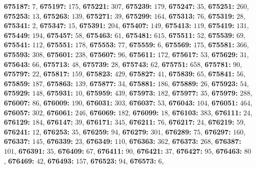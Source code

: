 \textsf{\bfseries 675187:} $7$, \textsf{\bfseries 675197:} $175$, \textsf{\bfseries 675221:} $307$, \textsf{\bfseries 675239:} $179$, \textsf{\bfseries 675247:} $35$, \textsf{\bfseries 675251:} $260$, \textsf{\bfseries 675253:} $13$, \textsf{\bfseries 675263:} $139$, \textsf{\bfseries 675271:} $39$, \textsf{\bfseries 675299:} $164$, \textsf{\bfseries 675313:} $76$, \textsf{\bfseries 675319:} $28$, \textsf{\bfseries 675341:} $2$, \textsf{\bfseries 675347:} $15$, \textsf{\bfseries 675391:} $204$, \textsf{\bfseries 675407:} $149$, \textsf{\bfseries 675413:} $119$, \textsf{\bfseries 675419:} $131$, \textsf{\bfseries 675449:} $194$, \textsf{\bfseries 675457:} $58$, \textsf{\bfseries 675463:} $61$, \textsf{\bfseries 675481:} $615$, \textsf{\bfseries 675511:} $52$, \textsf{\bfseries 675539:} $69$, \textsf{\bfseries 675541:} $112$, \textsf{\bfseries 675551:} $178$, \textsf{\bfseries 675553:} $77$, \textsf{\bfseries 675559:} $6$, \textsf{\bfseries 675569:} $175$, \textsf{\bfseries 675581:} $366$, \textsf{\bfseries 675593:} $308$, \textsf{\bfseries 675601:} $238$, \textsf{\bfseries 675607:} $96$, \textsf{\bfseries 675611:} $172$, \textsf{\bfseries 675617:} $53$, \textsf{\bfseries 675629:} $31$, \textsf{\bfseries 675643:} $66$, \textsf{\bfseries 675713:} $48$, \textsf{\bfseries 675739:} $28$, \textsf{\bfseries 675743:} $62$, \textsf{\bfseries 675751:} $658$, \textsf{\bfseries 675781:} $90$, \textsf{\bfseries 675797:} $22$, \textsf{\bfseries 675817:} $159$, \textsf{\bfseries 675823:} $429$, \textsf{\bfseries 675827:} $41$, \textsf{\bfseries 675839:} $65$, \textsf{\bfseries 675841:} $56$, \textsf{\bfseries 675859:} $187$, \textsf{\bfseries 675863:} $139$, \textsf{\bfseries 675877:} $34$, \textsf{\bfseries 675881:} $186$, \textsf{\bfseries 675889:} $26$, \textsf{\bfseries 675923:} $54$, \textsf{\bfseries 675929:} $148$, \textsf{\bfseries 675931:} $10$, \textsf{\bfseries 675959:} $439$, \textsf{\bfseries 675973:} $182$, \textsf{\bfseries 675977:} $35$, \textsf{\bfseries 675979:} $288$, \textsf{\bfseries 676007:} $86$, \textsf{\bfseries 676009:} $190$, \textsf{\bfseries 676031:} $303$, \textsf{\bfseries 676037:} $53$, \textsf{\bfseries 676043:} $104$, \textsf{\bfseries 676051:} $464$, \textsf{\bfseries 676057:} $302$, \textsf{\bfseries 676061:} $246$, \textsf{\bfseries 676069:} $182$, \textsf{\bfseries 676099:} $18$, \textsf{\bfseries 676103:} $383$, \textsf{\bfseries 676111:} $24$, \textsf{\bfseries 676129:} $184$, \textsf{\bfseries 676147:} $39$, \textsf{\bfseries 676171:} $345$, \textsf{\bfseries 676211:} $76$, \textsf{\bfseries 676217:} $24$, \textsf{\bfseries 676219:} $59$, \textsf{\bfseries 676241:} $12$, \textsf{\bfseries 676253:} $35$, \textsf{\bfseries 676259:} $94$, \textsf{\bfseries 676279:} $301$, \textsf{\bfseries 676289:} $75$, \textsf{\bfseries 676297:} $160$, \textsf{\bfseries 676337:} $145$, \textsf{\bfseries 676339:} $23$, \textsf{\bfseries 676349:} $110$, \textsf{\bfseries 676363:} $362$, \textsf{\bfseries 676373:} $268$, \textsf{\bfseries 676387:} $101$, \textsf{\bfseries 676391:} $35$, \textsf{\bfseries 676409:} $67$, \textsf{\bfseries 676411:} $90$, \textsf{\bfseries 676421:} $37$, \textsf{\bfseries 676427:} $95$, \textsf{\bfseries 676463:} $80$, \textsf{\bfseries 676469:} $42$, \textsf{\bfseries 676493:} $157$, \textsf{\bfseries 676523:} $94$, \textsf{\bfseries 676573:} $6$, 
